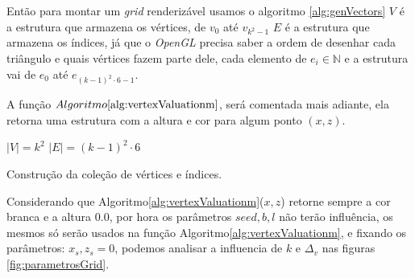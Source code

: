 Então para montar um \textit{grid} renderizável usamos o algoritmo \ref{alg:genVectors}
$V$ é a estrutura que armazena os vértices, de $v_{0}$ até $v_{k^2-1}$ 
$E$ é a estrutura que armazena os índices, já que o \textit{OpenGL} precisa
saber a ordem de desenhar cada triângulo e quais vértices fazem parte dele, 
cada elemento de $e_{i} \in \mathbb{N}$ e a estrutura vai de $e_{0}$ até $e_{(k-1)^2 \cdot 6 - 1}$.

A função \textit{$Algoritmo\ref{alg:vertexValuationm}$}, será comentada mais adiante, ela retorna uma estrutura
com a altura e cor para algum ponto $(x, z)$.
 
\begin{algorithm}[H]\label{alg:genVectors}
    $|V| = k^2$\;
    $|E| = (k-1)^2 \cdot 6$\;
    \caption{Construção da coleção de vértices e índices.}
\end{algorithm}

Considerando que Algoritmo\ref{alg:vertexValuationm}($x, z$) retorne sempre a cor branca
e a altura $0.0$, por hora os parâmetros $seed, b, l$ não terão influência, os mesmos 
só serão usados na função Algoritmo\ref{alg:vertexValuationm}, e fixando os parâmetros: $x_{s}, z_{s} = 0$, 
podemos analisar a influencia de $k$ e $\Delta_{v}$ nas figuras \ref{fig:parametrosGrid}.

